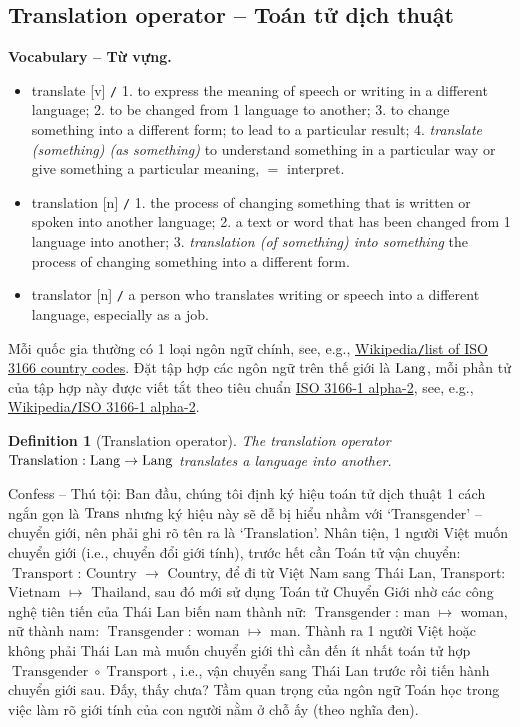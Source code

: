\documentclass[12pt,twoside]{book}
\newtheorem{definition}{Definition}[section]
\begin{document}
\subsection{Translation operator -- Toán tử dịch thuật}
\textbf{\textsf{\small Vocabulary -- Từ vựng.}}
\begin{itemize}\small
	\item {\sf translate} [v] {\tt/} 1. to express the meaning of speech or writing in a different language; 2. to be changed from 1 language to another; 3. to change something into a different form; to lead to a particular result; 4. {\it translate (something) (as something)} to understand something in a particular way or give something a particular meaning, $=$ {\sf interpret}.
	\item {\sf translation} [n] {\tt/} 1. the process of changing something that is written or spoken into another language; 2. a text or word that has been changed from 1 language into another; 3. {\it translation (of something) into something} the process of changing something into a different form.
	\item {\sf translator} [n] {\tt/} a person who translates writing or speech into a different language, especially as a job.
\end{itemize}
Mỗi quốc gia thường có 1 loại ngôn ngữ chính, see, e.g., \href{https://en.wikipedia.org/wiki/List_of_ISO_3166_country_codes}{Wikipedia{\tt/}list of ISO 3166 country codes}. Đặt tập hợp các ngôn ngữ trên thế giới là ${\rm Lang}$, mỗi phần tử của tập hợp này được viết tắt theo tiêu chuẩn \href{https://en.wikipedia.org/wiki/ISO_3166-1_alpha-2}{ISO 3166-1 alpha-2}, see, e.g., \href{https://en.wikipedia.org/wiki/ISO_3166-1_alpha-2}{Wikipedia{\tt/}ISO 3166-1 alpha-2}.

\begin{definition}[Translation operator]
	The \emph{translation operator} $\operatorname{Translation}:{\rm Lang}\to{\rm Lang}$ translates a language into another.
\end{definition}
{\sf Confess -- Thú tội}: Ban đầu, chúng tôi định ký hiệu toán tử dịch thuật 1 cách ngắn gọn là ${\rm Trans}$ nhưng ký hiệu này sẽ dễ bị hiểu nhầm với `Transgender' -- chuyển giới, nên phải ghi rõ tên ra là `Translation'. Nhân tiện, 1 người Việt muốn chuyển giới (i.e., chuyển đổi giới tính), trước hết cần Toán tử vận chuyển: $\operatorname{Transport}$: Country $\to$ Country, để đi từ Việt Nam sang Thái Lan, Transport: Vietnam $\mapsto$ Thailand, sau đó mới sử dụng Toán tử Chuyển Giới nhờ các công nghệ tiên tiến của Thái Lan biến nam thành nữ: $\operatorname{Transgender}$: man $\mapsto$ woman, nữ thành nam: $\operatorname{Transgender}$: woman $\mapsto$ man. Thành ra 1 người Việt hoặc không phải Thái Lan mà muốn chuyển giới thì cần đến ít nhất toán tử hợp $\operatorname{Transgender}\circ\operatorname{Transport}$, i.e., vận chuyển sang Thái Lan trước rồi tiến hành chuyển giới sau. Đấy, thấy chưa? Tầm quan trọng của ngôn ngữ Toán học trong việc làm rõ giới tính của con người nằm ở chỗ ấy (theo nghĩa đen).
\end{document}
